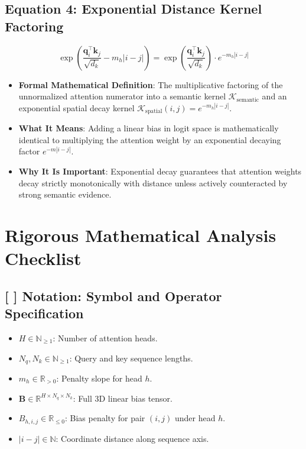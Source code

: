 \documentclass[11pt,a4paper]{article}
\theoremstyle{definition}
\begin{document}
\subsection{\textbf{Equation 4: Exponential Distance Kernel Factoring}}
{\boldmath
\begin{equation}
\exp\left( \frac{\mathbf{q}_i^\top \mathbf{k}_j}{\sqrt{d_k}} - m_h |i - j| \right) = \exp\left( \frac{\mathbf{q}_i^\top \mathbf{k}_j}{\sqrt{d_k}} \right) \cdot e^{-m_h |i - j|}
\end{equation}
}
\begin{itemize}
    \item \textbf{Formal Mathematical Definition}:
    The multiplicative factoring of the unnormalized attention numerator into a semantic kernel $\mathcal{K}_{\text{semantic}}$ and an exponential spatial decay kernel $\mathcal{K}_{\text{spatial}}(i, j) = e^{-m_h |i - j|}$.
    \item \textbf{What It Means}:
    Adding a linear bias in logit space is mathematically identical to multiplying the attention weight by an exponential decaying factor $e^{-m |i - j|}$.
    \item \textbf{Why It Is Important}:
    Exponential decay guarantees that attention weights decay strictly monotonically with distance unless actively counteracted by strong semantic evidence.
\end{itemize}

\section{Rigorous Mathematical Analysis Checklist}

\subsection{[ ] Notation: Symbol and Operator Specification}
\begin{itemize}
    \item $H \in \mathbb{N}_{\ge 1}$: Number of attention heads.
    \item $N_q, N_k \in \mathbb{N}_{\ge 1}$: Query and key sequence lengths.
    \item $m_h \in \mathbb{R}_{> 0}$: Penalty slope for head $h$.
    \item $\mathbf{B} \in \mathbb{R}^{H \times N_q \times N_k}$: Full 3D linear bias tensor.
    \item $B_{h, i, j} \in \mathbb{R}_{\le 0}$: Bias penalty for pair $(i, j)$ under head $h$.
    \item $|i - j| \in \mathbb{N}$: Coordinate distance along sequence axis.
\end{itemize}
\end{document}
